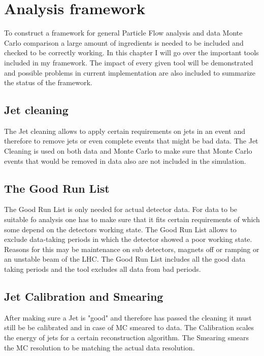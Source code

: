 \chapter{Analysis framework}

To construct a framework for general Particle Flow analysis and data Monte Carlo comparison a large amount of ingredients is needed to be included and checked to be correctly working. In this chapter I will go over the important tools included in my framework. The impact of every given tool will be demonstrated and possible problems in current implementation are also included to summarize the status of the framework.


\section{Jet cleaning}

The Jet cleaning allows to apply certain requirements on jets in an event and therefore to remove jets or even complete events that might be bad data. The Jet Cleaning is used on both data and Monte Carlo to make sure that Monte Carlo events that would be removed in data also are not included in the simulation.

\section{The Good Run List}

The Good Run List is only needed for actual detector data. For data to be suitable fo analysis one has to make sure that it fits certain requirements of which some depend on the detectors working state. The Good Run List allows to exclude data-taking periods in which the detector showed a poor working state. Reasons for this may be maintenance on sub detectors, magnets off or ramping or an unstable beam of the LHC.
The Good Run List includes all the good data taking periods and the tool excludes all data from bad periods.

\section{Jet Calibration and Smearing}

After making sure a Jet is "good" and therefore has passed the cleaning it must still be be calibrated and in case of MC smeared to data. The Calibration scales the energy of jets for a certain reconstruction algorithm. The Smearing smears the MC resolution to be matching the actual data resolution.


